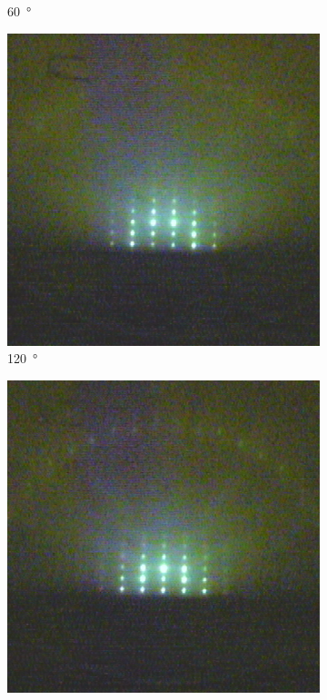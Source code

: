 \begin{figure}
\begin{subfigure}{0.2\linewidth}
        \caption{\qty{60}{\degree}}
    \end{subfigure}
    \begin{subfigure}{0.2\linewidth}
        \includegraphics[width=\textwidth]{../data/edited/2_1_143deg.pdf}
        \caption{\qty{120}{\degree}}
    \end{subfigure}
    \begin{subfigure}{0.2\linewidth}
        \includegraphics[width=\textwidth]{../data/edited/2_1_203deg.pdf}

\end{subfigure}
\end{figure}
